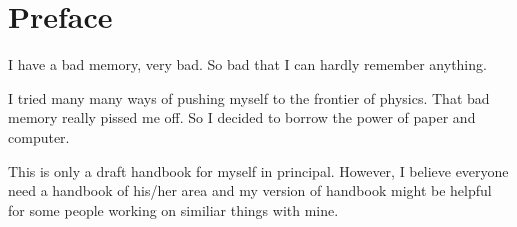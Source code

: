 \chapter{Preface}

I have a bad memory, very bad. So bad that I can hardly remember anything.

I tried many many ways of pushing myself to the frontier of physics. That bad memory really pissed me off. So I decided to borrow the power of paper and computer.

This is only a draft handbook for myself in principal. However, I believe everyone need a handbook of his/her area and my version of handbook might be helpful for some people working on similiar things with mine.